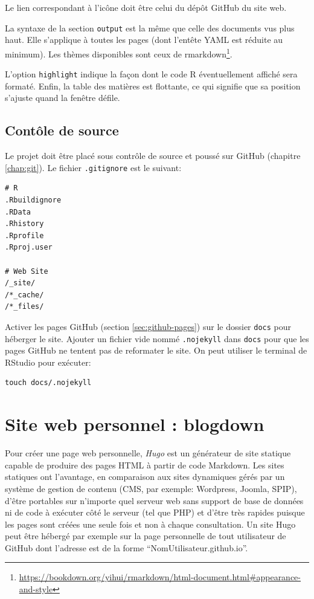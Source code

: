 \documentclass[
  12pt,
  french,
  a4paper,
  extrafontsizes,onecolumn,openright
  ]{memoir}
\begin{document}
Le lien correspondant à l'icône doit être celui du dépôt GitHub du site web.

La syntaxe de la section \texttt{output} est la même que celle des documents vus plus haut.
Elle s'applique à toutes les pages (dont l'entête YAML est réduite au minimum).
Les thèmes disponibles sont ceux de rmarkdown\footnote{\url{https://bookdown.org/yihui/rmarkdown/html-document.html\#appearance-and-style}}.

L'option \texttt{highlight} indique la façon dont le code R éventuellement affiché sera formaté.
Enfin, la table des matières est flottante, ce qui signifie que sa position s'ajuste quand la fenêtre défile.

\hypertarget{contuxf4le-de-source}{%
\subsection{Contôle de source}\label{contuxf4le-de-source}}

Le projet doit être placé sous contrôle de source et poussé sur GitHub (chapitre \ref{chap:git}).
Le fichier \texttt{.gitignore} est le suivant:

\begin{verbatim}
# R
.Rbuildignore
.RData
.Rhistory
.Rprofile
.Rproj.user

# Web Site
/_site/
/*_cache/
/*_files/
\end{verbatim}

Activer les pages GitHub (section \ref{sec:github-pages}) sur le dossier \texttt{docs} pour héberger le site.
Ajouter un fichier vide nommé \texttt{.nojekyll} dans \texttt{docs} pour que les pages GitHub ne tentent pas de reformater le site.
On peut utiliser le terminal de RStudio pour exécuter:

\begin{verbatim}
touch docs/.nojekyll
\end{verbatim}

\hypertarget{sec:blogdown}{%
\section{Site web personnel : blogdown}\label{sec:blogdown}}

Pour créer une page web personnelle, \emph{Hugo} est un générateur de site statique capable de produire des pages HTML à partir de code Markdown.
Les sites statiques ont l'avantage, en comparaison aux sites dynamiques gérés par un système de gestion de contenu (CMS, par exemple: Wordpress, Joomla, SPIP), d'être portables sur n'importe quel serveur web sans support de base de données ni de code à exécuter côté le serveur (tel que PHP) et d'être très rapides puisque les pages sont créées une seule fois et non à chaque consultation.
Un site Hugo peut être hébergé par exemple sur la page personnelle de tout utilisateur de GitHub dont l'adresse est de la forme \enquote{NomUtilisateur.github.io}.
\end{document}
